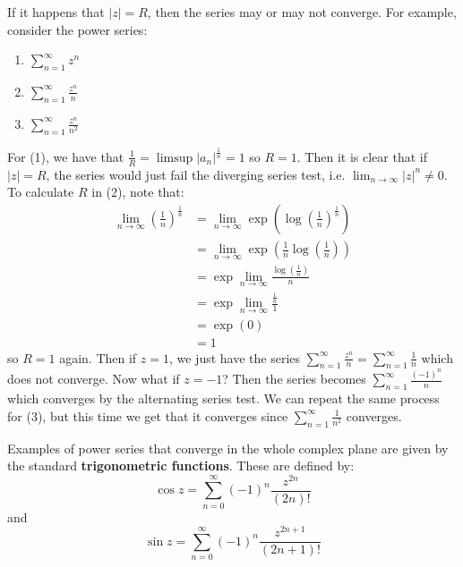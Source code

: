\begin{remark}
    If it happens that $|z|=R$, then the series may or may not converge. For example, consider the power series:
    \begin{enumerate}
        \item $\sum_{n=1}^{\infty} z^n$
        \item $\sum_{n=1}^{\infty} \frac{z^n}{n}$
        \item $\sum_{n=1}^{\infty} \frac{z^n}{n^2}$
    \end{enumerate}
    For (1), we have that $\frac{1}{R} = \limsup|a_n|^{\frac{1}{n}} = 1$ so $R = 1$. Then it is clear that
    if $|z| = R$, the series would just fail the diverging series test, i.e. $\lim_{n\to\infty} |z|^n \neq 0$.
    To calculate $R$ in (2), note that: 
    \begin{align*}
        \lim_{n\to\infty} (\frac{1}{n})^{\frac{1}{n}} &= \lim_{n\to\infty} \exp{(\log{(\frac{1}{n})^{\frac{1}{n}}})}\\
            &= \lim_{n\to\infty} \exp{(\frac{1}{n}\log{(\frac{1}{n})})} \\
            &= \exp{\lim_{n\to\infty}\frac{\log(\frac{1}{n})}{n}} \\
            &= \exp{\lim_{n\to\infty}\frac{\frac{1}{n}}{1}}\\
            &= \exp(0) \\
            &= 1
    \end{align*}
    so $R = 1$ again. Then if $z = 1$, we just have the series $\sum_{n=1}^{\infty} \frac{z^n}{n} = 
    \sum_{n=1}^{\infty} \frac{1}{n}$ which does not converge. Now what if $z = -1$? Then the series becomes
    $\sum_{n=1}^{\infty} \frac{(-1)^n}{n}$ which converges by the alternating series test.
    We can repeat the same process for (3), but this time
    we get that it converges since $\sum_{n=1}^{\infty} \frac{1}{n^2}$ converges.
\end{remark}

\begin{example}
    Examples of power series that converge in the whole complex plane are given by the standard
    \textbf{trigonometric functions}. These are defined by:
    \[ \cos{z} = \sum_{n=0}^{\infty} (-1)^n\frac{z^{2n}}{(2n)!} \]
    and
    \[ \sin{z} = \sum_{n=0}^{\infty} (-1)^n\frac{z^{2n+1}}{(2n+1)!} \]
\end{example}

